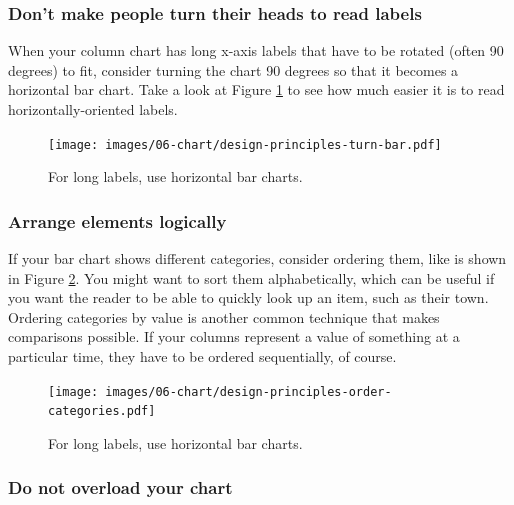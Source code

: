 \documentclass[
  english,
]{book}
\begin{document}
\hypertarget{dont-make-people-turn-their-heads-to-read-labels}{%
\subsubsection*{Don't make people turn their heads to read labels}\label{dont-make-people-turn-their-heads-to-read-labels}}

When your column chart has long x-axis labels that have to be rotated (often 90 degrees) to fit, consider turning the chart 90 degrees so that it becomes a horizontal bar chart. Take a look at Figure \ref{fig:design-principles-turn-bar} to see how much easier it is to read horizontally-oriented labels.



\begin{figure}
\centering
\texttt{[image: images/06-chart/design-principles-turn-bar.pdf]}
\caption{\label{fig:design-principles-turn-bar}For long labels, use horizontal bar charts.}
\end{figure}

\hypertarget{arrange-elements-logically}{%
\subsubsection*{Arrange elements logically}\label{arrange-elements-logically}}

If your bar chart shows different categories, consider ordering them, like is shown in Figure \ref{fig:design-principles-order-categories}. You might want to sort them alphabetically, which can be useful if you want the reader to be able to quickly look up an item, such as their town. Ordering categories by value is another common technique that makes comparisons possible. If your columns represent a value of something at a particular time, they have to be ordered sequentially, of course.



\begin{figure}
\centering
\texttt{[image: images/06-chart/design-principles-order-categories.pdf]}
\caption{\label{fig:design-principles-order-categories}For long labels, use horizontal bar charts.}
\end{figure}

\hypertarget{do-not-overload-your-chart}{%
\subsubsection*{Do not overload your chart}\label{do-not-overload-your-chart}}
\end{document}
